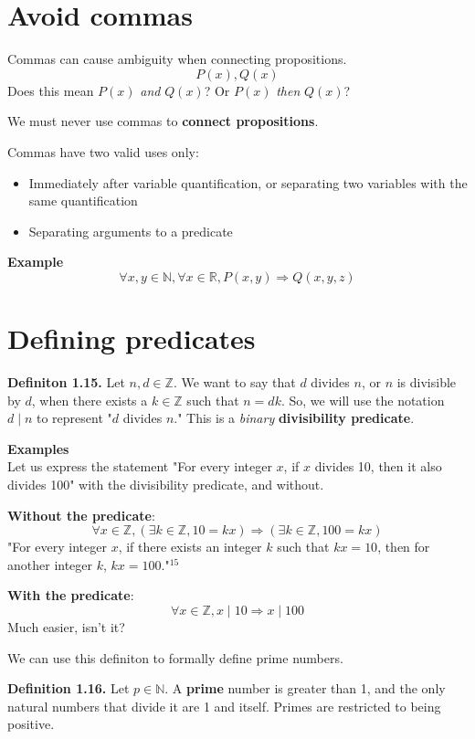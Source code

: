 \documentclass{article}
\begin{document}
\section{Avoid commas}
Commas can cause ambiguity when connecting propositions.
$$P(x), Q(x)$$
Does this mean $P(x)$ \textit{and} $Q(x)$? Or $P(x)$ \textit{then} $Q(x)$? 

We must never use commas to \textbf{connect propositions}.

Commas have two valid uses only:
\begin{itemize}
    \item Immediately after variable quantification, or separating two variables 
        with the same quantification
    \item Separating arguments to a predicate
\end{itemize}

\textbf{Example} 
$$\forall x, y \in \mathbb{N}, \forall x \in \mathbb{R}, P(x, y) \Rightarrow Q(x, y, z)$$

\section{Defining predicates}
\textbf{Definiton 1.15.} Let $n, d \in \mathbb{Z}$. We want to say that $d$ 
divides $n$, or $n$ is divisible by $d$, when there exists a $k \in \mathbb{Z}$ 
such that $n = dk$. So, we will use the notation $d \mid n$ to represent 
"$d$ divides $n$." This is a \textit{binary} \textbf{divisibility predicate}. 

\textbf{Examples} \\
Let us express the statement "For every integer $x$, if $x$ divides 10, then 
it also divides 100" with the divisibility predicate, and without.

\textbf{Without the predicate}:
$$\forall x \in \mathbb{Z}, (\exists k \in \mathbb{Z}, 10 = kx) \Rightarrow 
(\exists k \in \mathbb{Z}, 100 = kx)$$
"For every integer $x$, if there exists an integer $k$ such that $kx = 10$, then 
for another integer $k$, $kx = 100$."$^{15}$

\textbf{With the predicate}:
$$\forall x \in \mathbb{Z}, x \mid 10 \Rightarrow x \mid 100$$ 
Much easier, isn't it? 

We can use this definiton to formally define prime numbers.

\textbf{Definition 1.16.} Let $p \in \mathbb{N}$. A \textbf{prime} number is greater 
than 1, and the only natural numbers that divide it are 1 and itself. Primes are
restricted to being positive. 
\end{document}
